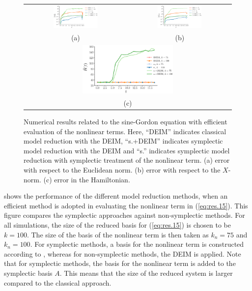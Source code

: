 \begin{figure} 
\begin{tabular}{cc}
\includegraphics[width=0.45\textwidth]{./images/paper2/sine/nonlinear/l2} & \includegraphics[width=0.45\textwidth]{./images/paper2/sine/nonlinear/energy_norm} \\
(a) & (b) \\
\multicolumn{2}{c}{
\includegraphics[width=0.45\textwidth]{./images/paper2/sine/nonlinear/energy}
} \\
\multicolumn{2}{c}{(c)} \\
\end{tabular}
\caption{Numerical results related to the sine-Gordon equation with efficient evaluation of the nonlinear terms. Here, ``DEIM'' indicates classical model reduction with the DEIM, ``s.+DEIM'' indicates symplectic model reduction with the DEIM and ``s.'' indicates symplectic model reduction with symplectic treatment of the nonlinear term. (a) error with respect to the Euclidean norm. (b) error with respect to the $X$-norm. (c) error in the Hamiltonian. } \label{fig:3}
\end{figure}

 shows the performance of the different model reduction methods, when an efficient method is adopted in evaluating the nonlinear term in (\ref{eq:res.15}). This figure compares the symplectic approaches against non-symplectic methods. For all simulations, the size of the reduced basis for (\ref{eq:res.15}) is chosen to be $k=100$. The size of the basis of the nonlinear term is then taken as $k_n=75$ and $k_n=100$. For symplectic methods, a basis for the nonlinear term is constructed according to , whereas for non-symplectic methods, the DEIM is applied. Note that for symplectic methods, the basis for the nonlinear term is added to the symplectic basis $A$. This means that the size of the reduced system is larger compared to the classical approach.


